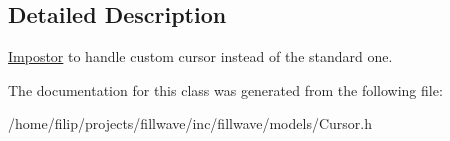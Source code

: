 \subsection{Detailed Description}
\hyperlink{classflw_1_1flf_1_1Impostor}{Impostor} to handle custom cursor instead of the standard one. 

The documentation for this class was generated from the following file\+:\begin{DoxyCompactItemize}
\item 
/home/filip/projects/fillwave/inc/fillwave/models/Cursor.\+h\end{DoxyCompactItemize}
